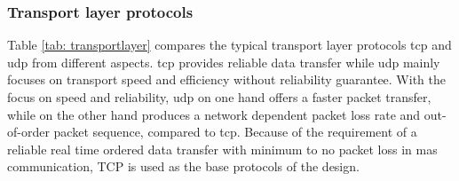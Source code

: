 \subsubsection{Transport layer protocols}


Table \ref{tab: transportlayer} compares the typical transport layer protocols \gls{tcp} and \gls{udp} from different aspects.  
\gls{tcp} provides reliable data transfer while \gls{udp} mainly focuses on transport speed and efficiency without reliability guarantee. 
With the focus on speed and reliability, \gls{udp} on one hand offers a faster packet transfer, while on the other hand produces a network dependent packet loss rate and out-of-order packet sequence, compared to \gls{tcp}. 
Because of the requirement of a reliable real time ordered data transfer with minimum to no packet loss in \gls{mas} communication, TCP is used as the base protocols of the design. 


